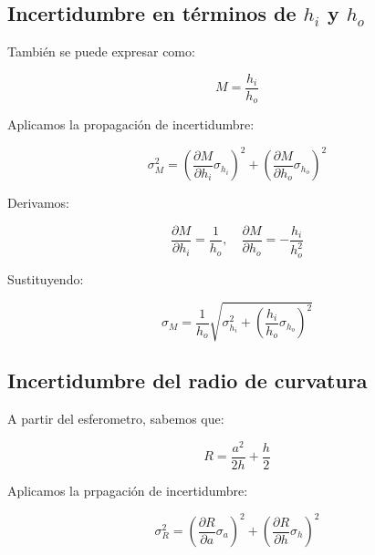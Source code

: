 \documentclass[article,12pt]{elsarticle}
\begin{document}
\subsection*{Incertidumbre en términos de $h_i$ y $h_o$}
También se puede expresar como:
\begin{mdframed}
\begin{equation}
    M = \frac{h_i}{h_o}
\end{equation}
\end{mdframed}
Aplicamos la propagación de incertidumbre:
\begin{mdframed}
\begin{equation}
    \sigma_M^2 = \left( \frac{\partial M}{\partial h_i} \sigma_{h_i} \right)^2 + \left( \frac{\partial M}{\partial h_o} \sigma_{h_o} \right)^2
\end{equation}
\end{mdframed}
Derivamos:

\begin{mdframed}
\begin{equation}
    \frac{\partial M}{\partial h_i} = \frac{1}{h_o}, \quad \frac{\partial M}{\partial h_o} = -\frac{h_i}{h_o^2}
\end{equation}
\end{mdframed}

Sustituyendo:
\begin{mdframed}
\begin{equation}
    \sigma_M = \frac{1}{h_o} \sqrt{\sigma_{h_i}^2 + \left(\frac{h_i}{h_o} \sigma_{h_o}\right)^2}
\end{equation}
\end{mdframed}

\subsection*{Incertidumbre del radio de curvatura}
A partir del esferometro, sabemos que:

\begin{mdframed}
\begin{equation}
    R = \frac{a^2}{2h} + \frac{h}{2}
\end{equation}
\end{mdframed}

Aplicamos la prpagación de incertidumbre:

\begin{mdframed}
\begin{equation}
    \sigma_R^2 = \left( \frac{\partial R}{\partial a} \sigma_{a} \right)^2 + \left( \frac{\partial R}{\partial h} \sigma_{h} \right)^2
\end{equation}
\end{mdframed}
\end{document}
